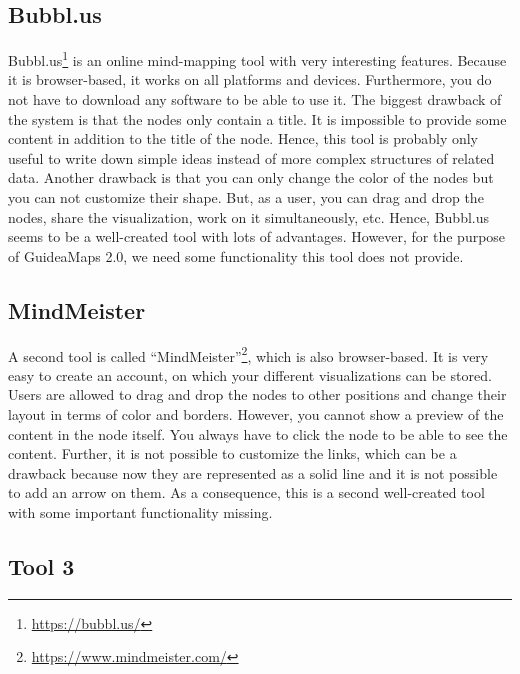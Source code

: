 \subsection{Bubbl.us}
Bubbl.us\footnote{\url{https://bubbl.us/}} is an online mind-mapping tool with very interesting features. Because it is browser-based, it works on all platforms and devices. Furthermore, you do not have to download any software to be able to use it. The biggest drawback of the system is that the nodes only contain a title. It is impossible to provide some content in addition to the title of the node. Hence, this tool is probably only useful to write down simple ideas instead of more complex structures of related data. Another drawback is that you can only change the color of the nodes but you can not customize their shape. But, as a user, you can drag and drop the nodes, share the visualization, work on it simultaneously, etc. Hence, Bubbl.us seems to be a well-created tool with lots of advantages. However, for the purpose of GuideaMaps 2.0, we need some functionality this tool does not provide.

\subsection{MindMeister}
A second tool is called ``MindMeister''\footnote{\url{https://www.mindmeister.com/}}, which is also browser-based. It is very easy to create an account, on which your different visualizations can be stored. Users are allowed to drag and drop the nodes to other positions and change their layout in terms of color and borders. However, you cannot show a preview of the content in the node itself. You always have to click the node to be able to see the content. Further, it is not possible to customize the links, which can be a drawback because now they are represented as a solid line and it is not possible to add an arrow on them. As a consequence, this is a second well-created tool with some important functionality missing.

\subsection{Tool 3}





